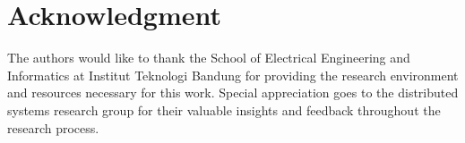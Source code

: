 \section*{Acknowledgment}

The authors would like to thank the School of Electrical Engineering and Informatics at Institut Teknologi Bandung for providing the research environment and resources necessary for this work. Special appreciation goes to the distributed systems research group for their valuable insights and feedback throughout the research process.